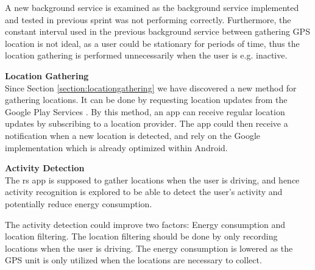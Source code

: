 A new background service is examined as the background service implemented and tested in previous sprint was not performing correctly.
Furthermore, the constant interval used in the previous background service between gathering GPS location is not ideal, as a user could be stationary for periods of time, thus the location gathering is performed unnecessarily when the user is e.g. inactive.

\textbf{Location Gathering}\\
Since Section \ref{section:locationgathering} we have discovered a new method for gathering locations. 
It can be done by requesting location updates from the Google Play Services \cite{receivingLocationUpdates}.
By this method, an app can receive regular location updates by subscribing to a location provider.
The app could then receive a notification when a new location is detected, and rely on the Google implementation which is already optimized within Android.

\textbf{Activity Detection}\\
The \gls{rs} app is supposed to gather locations when the user is driving, and hence activity recognition is explored to be able to detect the user's activity and potentially reduce energy consumption.

The activity detection could improve two factors: Energy consumption and location filtering.
The location filtering should be done by only recording locations when the user is driving.
The energy consumption is lowered as the GPS unit is only utilized when the locations are necessary to collect.
